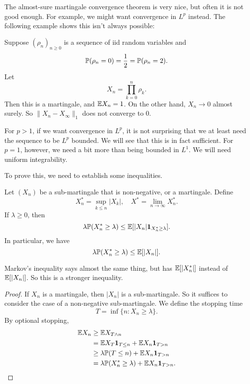 \documentclass[a4paper]{article}
\begin{document}
The almost-sure martingale convergence theorem is very nice, but often it is not good enough. For example, we might want convergence in $L^p$ instead. The following example shows this isn't always possible:

\begin{eg}
  Suppose $(\rho_n)_{n \geq 0}$ is a sequence of iid random variables and
  \[
    \P(\rho_n = 0) = \frac{1}{2} = \P(\rho_n = 2).
  \]
  Let
  \[
    X_n = \prod_{k = 0}^n \rho_k.
  \]
  Then this is a martingale, and $\E X_n = 1$. On the other hand, $X_n \to 0$ almost surely. So $\|X_n - X_\infty\|_1$ does not converge to $0$.
\end{eg}

For $p > 1$, if we want convergence in $L^p$, it is not surprising that we at least need the sequence to be $L^p$ bounded. We will see that this is in fact sufficient. For $p = 1$, however, we need a bit more than being bounded in $L^1$. We will need uniform integrability.

To prove this, we need to establish some inequalities.
\begin{lemma}
  Let $(X_n)$ be a sub-martingale that is non-negative, or a martingale. Define
  \[
    X^*_n = \sup_{k \leq n} |X_k|,\quad X^* = \lim_{n \to \infty} X_n^*.
  \]
  If $\lambda \geq 0$, then
  \[
    \lambda \P(X_n^* \geq \lambda) \leq \E[|X_n|\mathbf{1}_{X_n^* \geq \lambda}].
  \]
  In particular, we have
  \[
    \lambda \P(X_n^* \geq \lambda) \leq \E[|X_n|].
  \]
\end{lemma}
Markov's inequality says almost the same thing, but has $\E[|X_n^*|]$ instead of $\E[|X_n|]$. So this is a stronger inequality.

\begin{proof}
  If $X_n$ is a martingale, then $|X_n|$ is a sub-martingale. So it suffices to consider the case of a non-negative sub-martingale. We define the stopping time
  \[
    T = \inf\{n: X_n \geq \lambda\}.
  \]
  By optional stopping,
  \begin{align*}
    \E X_n &\geq \E X_{T \wedge n} \\\qedhere
    &= \E X_T \mathbf{1}_{T \leq n} + \E X_n \mathbf{1}_{T > n}\\
    &\geq \lambda \P(T \leq n) + \E X_n \mathbf{1}_{T > n}\\
    &= \lambda \P(X_n^* \geq \lambda) + \E X_n \mathbf{1}_{T > n}.\qedhere
  \end{align*}
\end{proof}
\end{document}

